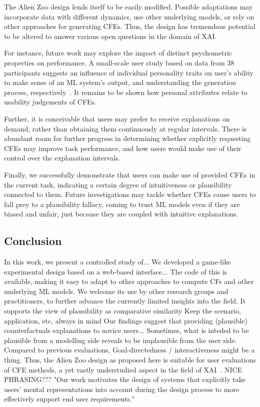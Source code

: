 The Alien Zoo design lends itself to be easily modified. 
Possible adaptations may incorporate data with different dynamics, use other underlying models, or rely on other approaches for generating \glspl{CFE}.
Thus, the design has tremendous potential to be altered to answer various open questions in the domain of \gls{XAI}.

For instance, future work may explore the impact of distinct psychometric properties on performance. 
A small-scale user study based on data from 38 participants suggests an influence of individual personality traits on user's ability to make sense of an \gls{ML} system's output, and understanding the generation process, respectively~\citep{gleaves_role_2020}.
It remains to be shown how personal attributes relate to usability judgements of \glspl{CFE}.

Further, it is conceivable that users may prefer to receive explanations on demand, rather than obtaining them continuously at regular intervals.
There is abundant room for further progress in determining whether explicitly requesting \glspl{CFE} may improve task performance, and how users would make use of their control over the explanation intervals.

Finally, we successfully demonstrate that users can make use of provided \glspl{CFE} in the current task, indicating a certain degree of intuitiveness or plausibility connected to them. 
Future investigations may tackle whether \glspl{CFE} cause users to fall prey to a plausibility fallacy, coming to trust ML models even if they are biased and unfair, just because they are coupled with intuitive explanations.

\subsection{Conclusion}\label{subsec:conclusion}
\textcolor{ACMDarkBlue}{
In this work, we present a controlled study of...
We developed a game-like experimental design based on a web-based interface...
The code of this is available, making it easy to adapt to other approaches to compute CFs and other underlying ML models. We welcome its use by other research groups and practitioners, to further advance the currently limited insights into the field.
It supports the view of plausibility as comparative similarity
} \textcolor{ACMDarkBlue}{
Keep the scenario, application, etc, always in mind
Our findings suggest that providing (plausible) counterfactuals explanations to novice users...
Sometimes, what is inteded to be plausible from a modelling side reveals to be implausible from the user side.
Compared to previous evaluations, Goal-directedness / interactiveness might be a thing.
Thus, the Alien Zoo design as proposed here is suitable for user evaluations of \gls{CFE} methods, a yet vastly understudied aspect in the field of \gls{XAI}~\citep{keane_if_2021}.
NICE PHRASING??? "Our work motivates the design of systems that explicitly take users’ mental representations into account during the design process to more effectively support end user requirements."
}

